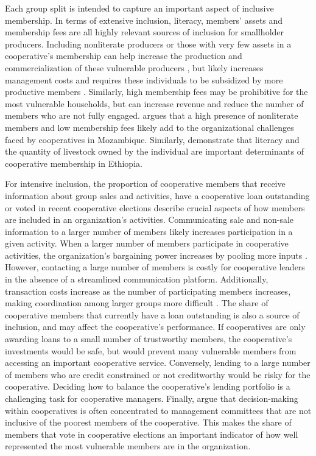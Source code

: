 \documentclass[11pt]{article}
\begin{document}
Each group split is intended to capture an important aspect of inclusive membership. In terms of extensive inclusion, literacy, members' assets and membership fees are all highly relevant sources of inclusion for smallholder producers. Including nonliterate producers or those with very few assets in a cooperative's membership can help increase the production and commercialization of these vulnerable producers \citep{poole_review_2010}, but likely increases management costs and requires these individuals to be subsidized by more productive members \citep{world_bank_world_2008}. Similarly, high membership fees may be prohibitive for the most vulnerable households, but can increase revenue and reduce the number of members who are not fully engaged. \citet{bachke_farmers_2019} argues that a high presence of nonliterate members and low membership fees likely add to the organizational challenges faced by cooperatives in Mozambique. Similarly,  \citet{bernard_reaching_2009} demonstrate that literacy and the quantity of livestock owned by the individual are important determinants of cooperative membership in Ethiopia.

For intensive inclusion, the proportion of cooperative members that receive information about group sales and activities, have a cooperative loan outstanding or voted in recent cooperative elections describe crucial aspects of how members are included in an organization's activities. Communicating sale and non-sale information to a larger number of members likely increases participation in a given activity. When a larger number of members participate in cooperative activities, the organization's bargaining power increases by pooling more inputs \citep{aflagah_cheap_2019}. However, contacting a large number of members is costly for cooperative leaders in the absence of a streamlined communication platform. Additionally, transaction costs increase as the number of participating members increases, making coordination among larger groups more difficult \citep{aflagah_cheap_2019}. The share of cooperative members that currently have a loan outstanding is also a source of inclusion, and may affect the cooperative's performance. If cooperatives are only awarding loans to a small number of trustworthy members, the cooperative's investments would be safe, but would prevent many vulnerable members from accessing an important cooperative service. Conversely, lending to a large number of members who are credit constrained or not creditworthy would be risky for the cooperative. Deciding how to balance the cooperative's lending portfolio is a challenging task for cooperative managers. Finally, \citet{bernard_reaching_2009} argue that decision-making within cooperatives is often concentrated to management committees that are not inclusive of the poorest members of the cooperative. This makes the share of members that vote in cooperative elections an important indicator of how well represented the most vulnerable members are in the organization. 
\end{document}
